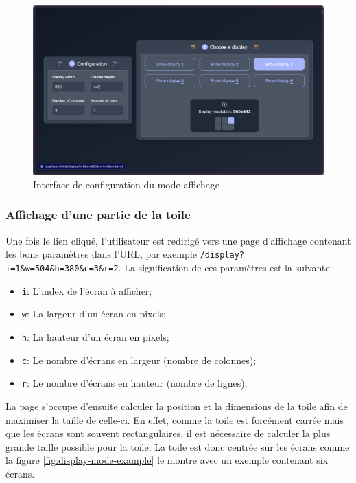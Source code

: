 \begin{figure}[H]
  \centering
  \includegraphics[width=1\textwidth]{./assets/figures/display-mode-config.png}
  \caption{Interface de configuration du mode affichage}
  \label{fig:display-mode-config}
\end{figure}

\subsubsection{Affichage d'une partie de la toile}

Une fois le lien cliqué, l'utilisateur est redirigé vers une page d'affichage contenant les bons paramètres dans l'URL, par exemple \texttt{/display?i=1\&w=504\&h=380\&c=3\&r=2}. La signification de ces paramètres est la suivante:

\begin{itemize}
  \item \texttt{i}: L'index de l'écran à afficher;
  \item \texttt{w}: La largeur d'un écran en pixels;
  \item \texttt{h}: La hauteur d'un écran en pixels;
  \item \texttt{c}: Le nombre d'écrans en largeur (nombre de colonnes);
  \item \texttt{r}: Le nombre d'écrans en hauteur (nombre de lignes).
\end{itemize}

La page s'occupe d'ensuite calculer la position et la dimensions de la toile afin de maximiser la taille de celle-ci. En effet, comme la toile est forcément carrée mais que les écrans sont souvent rectangulaires, il est nécessaire de calculer la plus grande taille possible pour la toile. La toile est donc centrée sur les écrans comme la figure \ref{fig:display-mode-example} le montre avec un exemple contenant six écrans.

